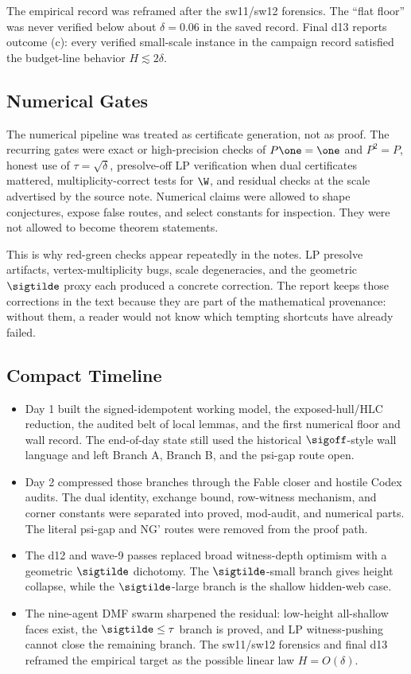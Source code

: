 \begin{numericalresult}
\numbadge{} The empirical record was reframed after the sw11/sw12 forensics.
The ``flat floor'' was never verified below about $\delta=0.06$ in the saved
record.  Final d13 reports outcome (c): every verified small-scale instance in
the campaign record satisfied the budget-line behavior \(H\lesssim2\delta\).
\end{numericalresult}

\subsection{Numerical Gates}

The numerical pipeline was treated as certificate generation, not as proof.
The recurring gates were exact or high-precision checks of $P\one=\one$ and
$P^2=P$, honest use of $\tau=\sqrt{\delta}$, presolve-off LP verification when
dual certificates mattered, multiplicity-correct tests for $\W$, and residual
checks at the scale advertised by the source note.  Numerical claims were
allowed to shape conjectures, expose false routes, and select constants for
inspection.  They were not allowed to become theorem statements.

This is why red-green checks appear repeatedly in the notes.  LP presolve
artifacts, vertex-multiplicity bugs, scale degeneracies, and the geometric
$\sigtilde$ proxy each produced a concrete correction.  The report keeps those
corrections in the text because they are part of the mathematical provenance:
without them, a reader would not know which tempting shortcuts have already
failed.

\subsection{Compact Timeline}

\begin{itemize}[leftmargin=*]
\item Day 1 built the signed-idempotent working model, the exposed-hull/HLC
reduction, the audited belt of local lemmas, and the first numerical floor and
wall record.  The end-of-day state still used the historical $\sigoff$-style
wall language and left Branch A, Branch B, and the psi-gap route open.
\item Day 2 compressed those branches through the Fable closer and hostile
Codex audits.  The dual identity, exchange bound, row-witness mechanism, and
corner constants were separated into proved, mod-audit, and numerical parts.
The literal psi-gap and NG' routes were removed from the proof path.
\item The d12 and wave-9 passes replaced broad witness-depth optimism with a
geometric $\sigtilde$ dichotomy.  The $\sigtilde$-small branch gives height
collapse, while the $\sigtilde$-large branch is the shallow hidden-web case.
\item The nine-agent DMF swarm sharpened the residual: low-height all-shallow
faces exist, the $\sigtilde\le\tau$ branch is proved, and LP witness-pushing
cannot close the remaining branch.  The sw11/sw12 forensics and final d13
reframed the empirical target as the possible linear law \(H=O(\delta)\).
\end{itemize}

